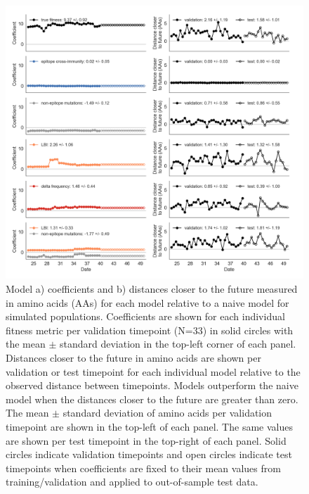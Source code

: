 \begin{figure}[ht!]
  \begin{center}
  \includegraphics[width=\textwidth]{figures/unadjusted-model-accuracy-and-coefficients-for-simulated-populations.png}
  \caption{
    Model a) coefficients and b) distances closer to the future measured in amino acids (AAs) for each model relative to a naive model for simulated populations.
    Coefficients are shown for each individual fitness metric per validation timepoint (N=33) in solid circles with the mean $\pm$ standard deviation in the top-left corner of each panel.
    Distances closer to the future in amino acids are shown per validation or test timepoint for each individual model relative to the observed distance between timepoints.
    Models outperform the naive model when the distances closer to the future are greater than zero.
    The mean $\pm$ standard deviation of amino acids per validation timepoint are shown in the top-left of each panel.
    The same values are shown per test timepoint in the top-right of each panel.
    Solid circles indicate validation timepoints and open circles indicate test timepoints when coefficients are fixed to their mean values from training/validation and applied to out-of-sample test data.
  }
  \label{fig:unadjusted_model_accuracy_and_coefficients_for_simulated_populations}
  \end{center}
\end{figure}

